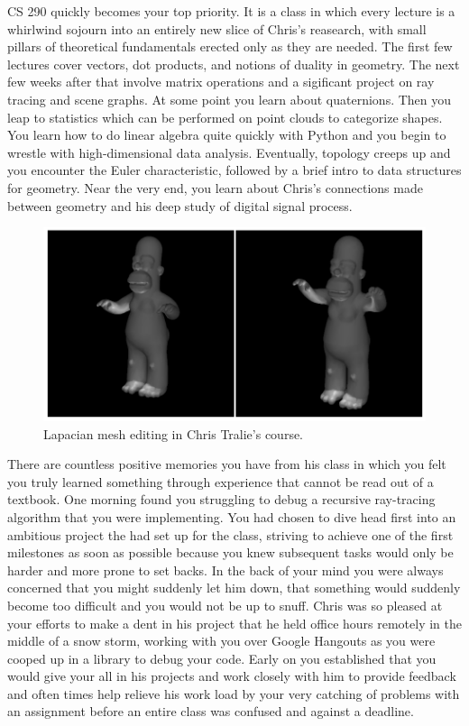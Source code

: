 \documentclass[a4paper, 11pt]{article} %
\begin{document}
CS 290 quickly becomes your top priority. It is a class in which every lecture is a whirlwind sojourn into an entirely new slice of Chris's reasearch, with small pillars of theoretical fundamentals erected only as they are needed. The first few lectures cover vectors, dot products, and notions of duality in geometry. The next few weeks after that involve matrix operations and a sigificant project on ray tracing and scene graphs. At some point you learn about quaternions. Then you leap to statistics which can be performed on point clouds to categorize shapes. You learn how to do linear algebra quite quickly with Python and you begin to wrestle with high-dimensional data analysis. Eventually, topology creeps up and you encounter the Euler characteristic, followed by a brief intro to data structures for geometry. Near the very end, you learn about Chris's connections made between geometry and his deep study of digital signal process.

\begin{figure}[h!]
	\centering
	\includegraphics[width=\textwidth]{homer}
	\caption*{Lapacian mesh editing in Chris Tralie's course.}
\end{figure}

There are countless positive memories you have from his class in which you felt you truly learned something through experience that cannot be read out of a textbook. One morning found you struggling to debug a recursive ray-tracing algorithm that you were implementing. You had chosen to dive head first into an ambitious project the had set up for the class, striving to achieve one of the first milestones as soon as possible because you knew subsequent tasks would only be harder and more prone to set backs. In the back of your mind you were always concerned that you might suddenly let him down, that something would suddenly become too difficult and you would not be up to snuff. Chris was so pleased at your efforts to make a dent in his project that he held office hours remotely in the middle of a snow storm, working with you over Google Hangouts as you were cooped up in a library to debug your code. Early on you established that you would give your all in his projects and work closely with him to provide feedback and often times help relieve his work load by your very catching of problems with an assignment before an entire class was confused and against a deadline. 
\end{document}
